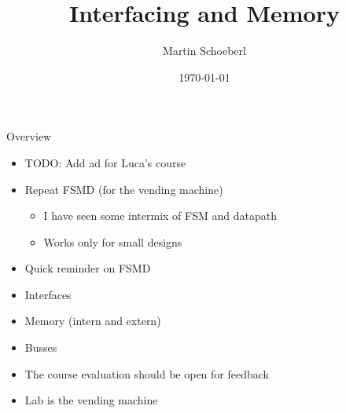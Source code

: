 

\newif\ifbook


\title{Interfacing and Memory}
\author{Martin Schoeberl}
\date{\today}



\begin{frame}
\titlepage
\end{frame}


\begin{frame}[fragile]{Overview}
\begin{itemize}
\item TODO: Add ad for Luca's course
\item Repeat FSMD (for the vending machine)
\begin{itemize}
\item I have seen some intermix of FSM and datapath
\item Works only for small designs
\end{itemize}
\item Quick reminder on FSMD
\item Interfaces
\item Memory (intern and extern)
\item Busses
\item The course evaluation should be open for feedback
\item Lab is the vending machine
\end{itemize}
\end{frame}

